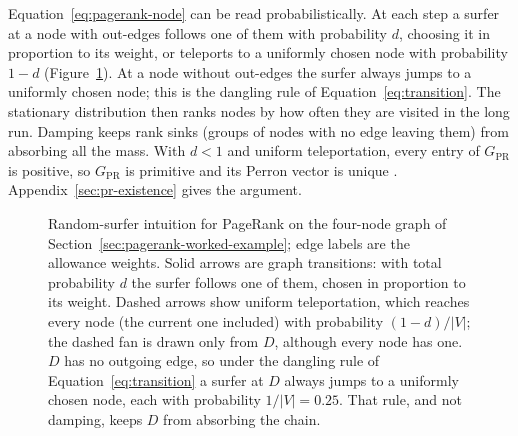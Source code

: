Equation~\eqref{eq:pagerank-node} can be read probabilistically. At each step a surfer at a node with out-edges follows one of them with probability $d$, choosing it in proportion to its weight, or teleports to a uniformly chosen node with probability $1-d$ (Figure~\ref{fig:random-surfer}). At a node without out-edges the surfer always jumps to a uniformly chosen node; this is the dangling rule of Equation~\eqref{eq:transition}. The stationary distribution then ranks nodes by how often they are visited in the long run. Damping keeps rank sinks (groups of nodes with no edge leaving them) from absorbing all the mass. With $d<1$ and uniform teleportation, every entry of $G_{\mathrm{PR}}$ is positive, so $G_{\mathrm{PR}}$ is primitive and its Perron vector is unique \parencite{langville2006pagerank}. Appendix~\ref{sec:pr-existence} gives the argument.

\begin{figure}[htbp]
\centering
{}
\caption[{Random-surfer intuition for PageRank on the four-node graph of Section~\ref{sec:pagerank-worked-example}. Solid arrows are graph transitions, followed with total probability $d$. Dashed arrows are uniform teleportation, probability $(1-d)/|V|$ to every node including the current one; the dashed fan is drawn from $D$ only but leaves every node.}]{Random-surfer intuition for PageRank on the four-node graph of Section~\ref{sec:pagerank-worked-example}; edge labels are the allowance weights. Solid arrows are graph transitions: with total probability $d$ the surfer follows one of them, chosen in proportion to its weight. Dashed arrows show uniform teleportation, which reaches every node (the current one included) with probability $(1-d)/|V|$; the dashed fan is drawn only from $D$, although every node has one. $D$ has no outgoing edge, so under the dangling rule of Equation~\eqref{eq:transition} a surfer at $D$ always jumps to a uniformly chosen node, each with probability $1/|V|=0.25$. That rule, and not damping, keeps $D$ from absorbing the chain.}
\label{fig:random-surfer}
\end{figure}

